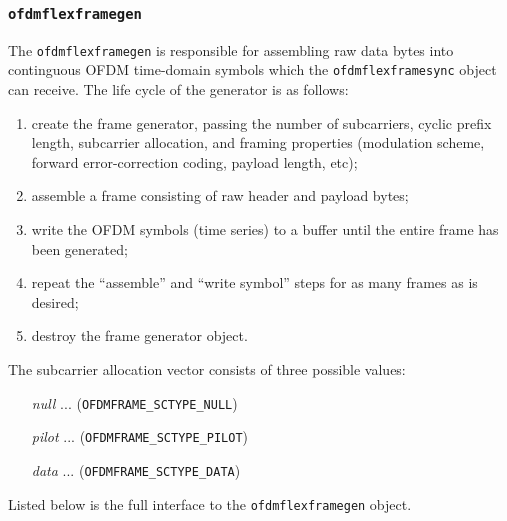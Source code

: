 \subsubsection{{\tt ofdmflexframegen}}
\label{module:framing:ofdmflexframe:gen}
%
The {\tt ofdmflexframegen} is responsible for assembling raw data bytes
into continguous OFDM time-domain symbols which the
{\tt ofdmflexframesync} object can receive.
The life cycle of the generator is as follows:
%
\begin{enumerate}
\item create the frame generator, passing the number of subcarriers,
      cyclic prefix length, subcarrier allocation, and framing
      properties (modulation scheme, forward error-correction
      coding, payload length, etc);
\item assemble a frame consisting of raw header and payload bytes;
\item write the OFDM symbols (time series) to a buffer until the entire
      frame has been generated;
\item repeat the ``assemble'' and ``write symbol'' steps for as many
      frames as is desired;
\item destroy the frame generator object.
\end{enumerate}
%
The subcarrier allocation vector consists of three possible values:
\begin{itemize}
\item[{\em null}] ...
    ({\tt OFDMFRAME\_SCTYPE\_NULL})
\item[{\em pilot}]...
    ({\tt OFDMFRAME\_SCTYPE\_PILOT})
\item[{\em data}]...
    ({\tt OFDMFRAME\_SCTYPE\_DATA})
\end{itemize}
%
Listed below is the full interface to the {\tt ofdmflexframegen}
object.
%
%
